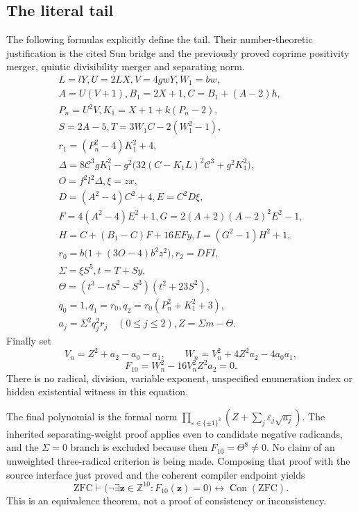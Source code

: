 \subsection{The literal tail}
The following formulas explicitly define the tail.  Their number-theoretic
justification is the cited Sun bridge and the previously proved coprime
positivity merger, quintic divisibility merger and separating norm.
\begin{gather*}
 L=lY ,U=2LX ,V=4gwY ,W_1=bw ,\\
 A=U(V+1) , B_1=2X+1 , C=B_1+(A-2)h ,\\
 P_n=U^2V ,K_1=X+1+k(P_n-2) ,\\
 S=2A-5 ,T=3W_1C-2(W_1^2-1) ,\\
 r_1=(P_n^2-4)K_1^2+4 ,\\
 \Delta=8\mathcal C^3gK_1^2
   -g^2\bigl(32(C-K_1L)^2\mathcal C^3+g^2K_1^2\bigr) ,\\
 O=f^2l^2\Delta ,\xi=zx ,\\
 D=(A^2-4)C^2+4 ,E=C^2D\xi ,\\
 F=4(A^2-4)E^2+1 ,G=2(A+2)(A-2)^2E^2-1 ,\\
 H=C+(B_1-C)F+16EFy ,I=(G^2-1)H^2+1 ,\\
 r_0=b\bigl(1+(3O-4)b^2z^2\bigr) ,r_2=DFI ,\\
 \Sigma=\xi S^5 ,t=T+Sy ,\\
 \Theta=(t^3-tS^2-S^3)(t^2+23S^2) ,\\
 q_0=1 ,q_1=r_0 ,q_2=r_0(P_n^2+K_1^2+3) ,\\
 a_j=\Sigma^2q_j^2r_j\quad(0\le j\le2) ,Z=\Sigma m-\Theta.
\end{gather*}
Finally set
\[
 V_n=Z^2+a_2-a_0-a_1,\qquad
 W_n=V_n^2+4Z^2a_2-4a_0a_1,
\]
\begin{equation}
 \boxed{\ F_{10}=W_n^2-16V_n^2Z^2a_2=0.\ }
\end{equation}
There is no radical, division, variable exponent, unspecified enumeration
index or hidden existential witness in this equation.

The final polynomial is the formal norm
$\prod_{\varepsilon\in\{\pm1\}^3}
 (Z+\sum_j\varepsilon_j\sqrt{a_j})$.
The inherited separating-weight proof applies even to candidate negative
radicands, and the $\Sigma=0$ branch is excluded because then
$F_{10}=\Theta^8\ne0$.  No claim of an unweighted three-radical criterion
is being made. Composing that proof with the source interface just proved
and the coherent compiler endpoint yields
\[
 \mathrm{ZFC}\vdash
 \bigl(\neg\exists\mathbf z\in\mathbb Z^{10}:F_{10}(\mathbf z)=0\bigr)
 \longleftrightarrow\operatorname{Con}(\mathrm{ZFC}).
\]
This is an equivalence theorem, not a proof of consistency or inconsistency.

